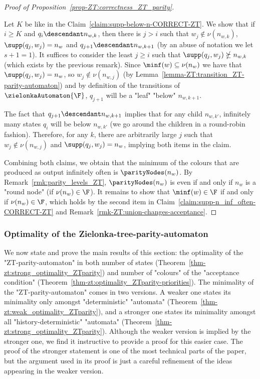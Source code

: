 \documentclass{theoretics}
\begin{document}
\begin{proof}[Proof of Proposition~\ref{prop-ZT:correctness_ZT_parity}]
\begin{subproof}
		Let $K$ be like in the Claim~\ref{claim:supp-below-n-CORRECT-ZT}.
		We show that if $i\geq K$ and $q_i\descendant n_{w,k}$, then there is $j> i$ such that $w_j\notin \nu(n_{w,k})$, $\supp(q_{j},w_{j}) = n_{w}$ and $q_{j+1}\descendant n_{w,k+1}$ (by an abuse of notation we let $s+1 = 1$). 
	    It suffices to consider the least $j \geq i$ such that $\supp(q_{j},w_{j})\nsucceq n_{w,k}$ (which exists by the previous remark). Since $\minf(w)\subseteq \nu(n_w)$ we have that $\supp(q_{j},w_{j}) = n_{w}$, so $w_j\notin \nu(n_{w,j})$ (by Lemma~\ref{lemma-ZT:transition_ZT-parity-automaton}) and by definition of the transitions of $\zielonkaAutomaton{\F}$, $q_{j+1}$ will be a "leaf" "below" $n_{w,k+1}$.
	    
	    The fact that $q_{j+1}\descendant n_{w,k+1}$ implies that for any child $n_{w,k'}$, infinitely many states $q_i$ will be below $n_{w,k'}$ (we go around the children in a round-robin fashion). Therefore, for any $k$, there are arbitrarily large $j$ such that $w_j\notin \nu(n_{w,j})$ and $\supp(q_{j},w_{j}) = n_{w}$, implying both items in the claim.
	\end{subproof}
	Combining both claims, we obtain that the minimum of the colours that are produced as output infinitely often is $\parityNodes(n_w)$. By Remark~\ref{rmk:parity_levels_ZT}, $\parityNodes(n_w)$ is even if and only if $n_w$ is a "round node" (if $\nu(n_w)\in \F$). It remains to show that $\minf(w) \in \F$ if and only if $\nu(n_w)\in \F$, which holds by the second item in Claim~\ref{claim:supp-n_inf_often-CORRECT-ZT} and Remark~\ref{rmk-ZT:union-changes-acceptance}.	
\end{proof}


\subsubsection{Optimality of the Zielonka-tree-parity-automaton}\label{subsubsec-zt-parity: optimality}
We now state and prove the main results of this section: the optimality of the "ZT-parity-automaton" in both number of states (Theorem~\ref{thm-zt:strong_optimality_ZTparity}) and number of "colours" of the "acceptance condition" (Theorem~\ref{thm-zt:optimality_ZTparity-priorities}).
The minimality of the "ZT-parity-automaton" comes in two versions. A weaker one states its minimality only amongst "deterministic" "automata" (Theorem~\ref{thm-zt:weak_optimality_ZTparity}), and a stronger one states its minimality amongst all "history-deterministic"  "automata" (Theorem~\ref{thm-zt:strong_optimality_ZTparity}). Although the weaker version is implied by the stronger one, we find it instructive to provide a proof for this easier case. The proof of the stronger statement is one of the most technical parts of the paper, but the argument used in its proof is just a careful refinement of the ideas appearing in the weaker version.
\end{document}
